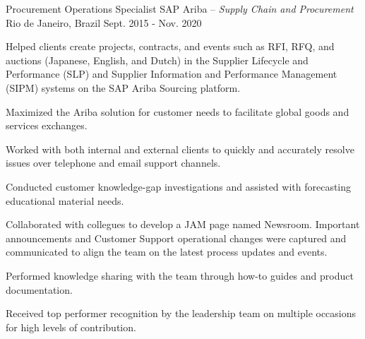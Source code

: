 


\begin{cventries}


\cventry
{Procurement Operations Specialist} %
{SAP Ariba \textmd{-- \em{Supply Chain and Procurement}}} %
{Rio de Janeiro, Brazil} %
{Sept. 2015 - Nov. 2020} %
{ %
\begin{cvitems}
\item {Helped clients create projects, contracts, and events such as RFI, RFQ, and auctions (Japanese, English, and Dutch)
in the Supplier Lifecycle and Performance (SLP) and Supplier Information and Performance Management (SIPM)
systems on the SAP Ariba Sourcing platform.}

\item {Maximized the Ariba solution for customer needs to facilitate global goods and services exchanges.}
\item {Worked with both internal and external clients to quickly and accurately resolve issues over telephone and email support channels.}
\item {Conducted customer knowledge-gap investigations and assisted with forecasting educational material needs.}
\item {Collaborated with collegues to develop a JAM page named Newsroom. Important announcements and Customer Support operational changes were captured and communicated to align the team on the latest process updates and events.}
\item {Performed knowledge sharing with the team through how-to guides and product documentation.}
\item {Received top performer recognition by the leadership team on multiple occasions for high levels of contribution.}

\end{cvitems}
}




\end{cventries}
